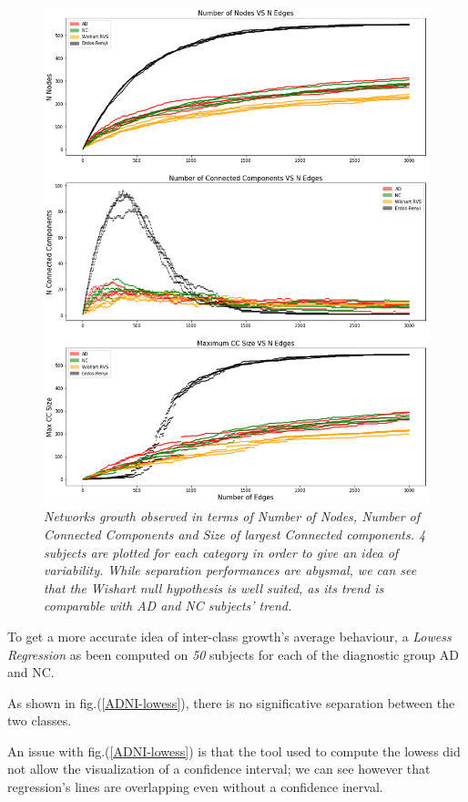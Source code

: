 \documentclass[12pt,openright,twoside,a4paper]{book}
\begin{document}
\begin{figure}[!h]
\centering
\includegraphics[scale=0.5]{ADNI-Ngrowth}
\caption{\textit{Networks growth observed in terms of Number of Nodes, Number of Connected Components and Size of largest Connected components. 4 subjects are plotted for each category in order to give an idea of variability. While separation performances are abysmal, we can see that the Wishart null hypothesis is well suited, as its trend is comparable with AD and NC subjects' trend. }}
\label{ADNI-Ngrowth}
\end{figure}

\clearpage

To get a more accurate idea of inter-class growth's average behaviour, a \textit{Lowess Regression} \cite{Lowess} as been computed on \textit{50} subjects for each of the diagnostic group AD and NC.

As shown in fig.(\ref{ADNI-lowess}), there is no significative separation between the two classes.

An issue with fig.(\ref{ADNI-lowess}) is that the tool used to compute the lowess did not allow the visualization of a confidence interval; we can see however that regression's lines are overlapping even without a confidence inerval. 
\end{document}
